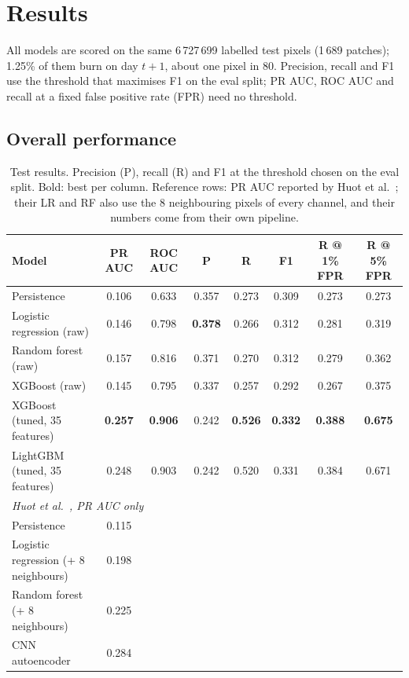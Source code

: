 
\section{Results}

All models are scored on the same 6\,727\,699 labelled test pixels (1\,689 patches); 1.25\% of them burn on
day $t+1$, about one pixel in 80. Precision, recall and F1 use the threshold that maximises F1 on the eval split;
PR AUC, ROC AUC and recall at a fixed false positive rate (FPR) need no threshold.

\subsection{Overall performance}

\begin{table}[t]
\centering
\caption{Test results. Precision (P), recall (R) and F1 at the threshold chosen on the eval split. Bold: best per
column. Reference rows: PR AUC reported by Huot et al.~\cite{huot2022}; their LR and RF also use the 8 neighbouring
pixels of every channel, and their numbers come from their own pipeline.}
\label{tab:results}
\begin{tabular}{lccccccc}
\hline
Model & PR AUC & ROC AUC & P & R & F1 & R @ 1\% FPR & R @ 5\% FPR \\
\hline
Persistence & 0.106 & 0.633 & 0.357 & 0.273 & 0.309 & 0.273 & 0.273 \\
Logistic regression (raw) & 0.146 & 0.798 & \textbf{0.378} & 0.266 & 0.312 & 0.281 & 0.319 \\
Random forest (raw) & 0.157 & 0.816 & 0.371 & 0.270 & 0.312 & 0.279 & 0.362 \\
XGBoost (raw) & 0.145 & 0.795 & 0.337 & 0.257 & 0.292 & 0.267 & 0.375 \\
XGBoost (tuned, 35 features) & \textbf{0.257} & \textbf{0.906} & 0.242 & \textbf{0.526} & \textbf{0.332} & \textbf{0.388} & \textbf{0.675} \\
LightGBM (tuned, 35 features) & 0.248 & 0.903 & 0.242 & 0.520 & 0.331 & 0.384 & 0.671 \\
\hline
\multicolumn{8}{l}{\textit{Huot et al.~\cite{huot2022}, PR AUC only}} \\
Persistence & 0.115 & & & & & & \\
Logistic regression (+ 8 neighbours) & 0.198 & & & & & & \\
Random forest (+ 8 neighbours) & 0.225 & & & & & & \\
CNN autoencoder & 0.284 & & & & & & \\
\hline
\end{tabular}
\end{table}


